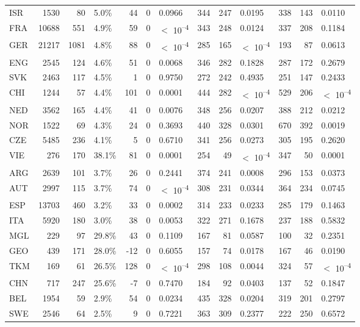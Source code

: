 \begin{tabular}[t]{lrrlrrlrrlrrl}
ISR & 1530 & 80 & 5.0\% & 44 & 0 & 0.0966 & 344 & 247 & 0.0195 & 338 & 143 & 0.0110\\
FRA & 10688 & 551 & 4.9\% & 59 & 0 & $<$ 10\textsuperscript{--4} & 343 & 248 & 0.0124 & 337 & 208 & 0.1184\\
GER & 21217 & 1081 & 4.8\% & 88 & 0 & $<$ 10\textsuperscript{--4} & 285 & 165 & $<$ 10\textsuperscript{--4} & 193 & 87 & 0.0613\\
ENG & 2545 & 124 & 4.6\% & 51 & 0 & 0.0068 & 346 & 282 & 0.1828 & 287 & 172 & 0.2679\\
SVK & 2463 & 117 & 4.5\% & 1 & 0 & 0.9750 & 272 & 242 & 0.4935 & 251 & 147 & 0.2433\\
CHI & 1244 & 57 & 4.4\% & 101 & 0 & 0.0001 & 444 & 282 & $<$ 10\textsuperscript{--4} & 529 & 206 & $<$ 10\textsuperscript{--4}\\
NED & 3562 & 165 & 4.4\% & 41 & 0 & 0.0076 & 348 & 256 & 0.0207 & 388 & 212 & 0.0212\\
NOR & 1522 & 69 & 4.3\% & 24 & 0 & 0.3693 & 440 & 328 & 0.0301 & 670 & 392 & 0.0019\\
CZE & 5485 & 236 & 4.1\% & 5 & 0 & 0.6710 & 341 & 256 & 0.0273 & 305 & 195 & 0.2620\\
VIE & 276 & 170 & 38.1\% & 81 & 0 & 0.0001 & 254 & 49 & $<$ 10\textsuperscript{--4} & 347 & 50 & 0.0001\\
ARG & 2639 & 101 & 3.7\% & 26 & 0 & 0.2441 & 374 & 241 & 0.0008 & 296 & 153 & 0.0373\\
AUT & 2997 & 115 & 3.7\% & 74 & 0 & $<$ 10\textsuperscript{--4} & 308 & 231 & 0.0344 & 364 & 234 & 0.0745\\
ESP & 13703 & 460 & 3.2\% & 33 & 0 & 0.0002 & 314 & 233 & 0.0233 & 285 & 179 & 0.1463\\
ITA & 5920 & 180 & 3.0\% & 38 & 0 & 0.0053 & 322 & 271 & 0.1678 & 237 & 188 & 0.5832\\
MGL & 229 & 97 & 29.8\% & 43 & 0 & 0.1109 & 167 & 81 & 0.0587 & 100 & 32 & 0.2351\\
GEO & 439 & 171 & 28.0\% & -12 & 0 & 0.6055 & 157 & 74 & 0.0178 & 167 & 46 & 0.0190\\
TKM & 169 & 61 & 26.5\% & 128 & 0 & $<$ 10\textsuperscript{--4} & 298 & 108 & 0.0044 & 324 & 57 & $<$ 10\textsuperscript{--4}\\
CHN & 717 & 247 & 25.6\% & -7 & 0 & 0.7470 & 184 & 92 & 0.0403 & 137 & 52 & 0.1847\\
BEL & 1954 & 59 & 2.9\% & 54 & 0 & 0.0234 & 435 & 328 & 0.0204 & 319 & 201 & 0.2797\\
SWE & 2546 & 64 & 2.5\% & 9 & 0 & 0.7221 & 363 & 309 & 0.2377 & 222 & 250 & 0.6572\\

\end{tabular}
